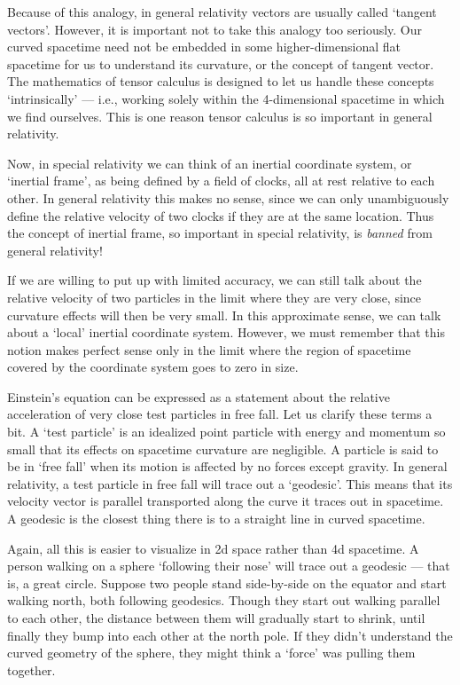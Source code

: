 \noindent
Because of this analogy, in general relativity vectors are usually called
`tangent vectors'.  However, it is important not to take this 
analogy too seriously.  Our curved spacetime need not be embedded in some
higher-dimensional flat spacetime for us to understand its curvature, or
the concept of tangent vector.  The mathematics of tensor calculus is
designed to let us handle these concepts `intrinsically' --- i.e.,
working solely within the 4-dimensional spacetime in which we find
ourselves.   This is one reason tensor calculus is so important
in general relativity.

Now, in special relativity we can think of an inertial coordinate
system, or `inertial frame', as being defined by a field of 
clocks, all at rest relative to each other.   In general relativity
this makes no sense, since we can only unambiguously define the 
relative velocity of two clocks if they are at the same location.  
Thus the concept of inertial frame, so important in special relativity,
is {\it banned} from general relativity!   

If we are willing to put up with limited accuracy, we can still talk
about the relative velocity of two particles in the limit where they are
very close, since curvature effects will then be very small.   In
this approximate sense, we can talk about a  `local' inertial coordinate
system.  However, we must remember that this notion makes
perfect sense only in the limit where the region of spacetime covered by the
coordinate system goes to zero in size.  

Einstein's equation can be expressed as a statement about the relative
acceleration of very close test particles in free fall.  Let us clarify
these terms a bit.  A `test particle' is an idealized point particle
with energy and momentum so small that its effects on spacetime curvature
are negligible.  A particle is said to be in `free fall' when its motion
is affected by no forces except gravity.  In general relativity, a test
particle in free fall will trace out a `geodesic'.  This means that its
velocity vector is parallel transported along the curve it traces out
in spacetime.  A geodesic is the closest thing there is to a straight line 
in curved spacetime.  

Again, all this is easier to visualize in 2d space rather than 4d
spacetime.  A person walking on a sphere `following their nose' will
trace out a geodesic --- that is, a great circle.  Suppose two people
stand side-by-side on the equator and start walking north, both
following geodesics.  Though they start out walking parallel to each
other, the distance between them will gradually start to shrink, until
finally they bump into each other at the north pole.  If they didn't
understand the curved geometry of the sphere, they might think a `force'
was pulling them together.  

